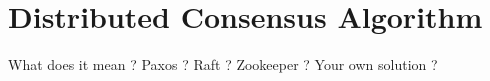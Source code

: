 \section{Distributed Consensus Algorithm}

What does it mean ?
Paxos ? Raft ? Zookeeper ? Your own solution ?